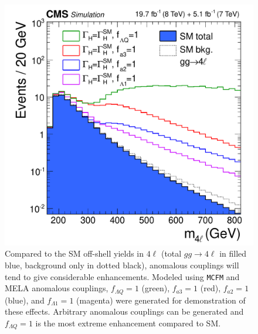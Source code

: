 \begin{figure}[htbp]
\begin{center}
\includegraphics[width=.7\linewidth]{HiggsProperties/figures/cCanvas_MCFMBSM_GenLevel_new.pdf}
\caption[Simulated Off-shell Enhancements in the $4\ell$ Channel from Anomalous $HVV$ Couplings]{Compared to the SM off-shell yields in $4\ell$ (total $gg\rightarrow 4\ell$ in filled blue, background only in dotted black), anomalous couplings will tend to give considerable enhancements. Modeled using {\tt MCFM} and MELA anomalous couplings, $f_{\Lambda Q}=1$ (green), $f_{a3}=1$ (red), $f_{a2}=1$ (blue), and $f_{\Lambda 1}=1$ (magenta) were generated for demonstration of these effects. Arbitrary anomalous couplings can be generated and $f_{\Lambda Q}=1$ is the most extreme enhancement compared to SM.}
\label{fig:MCFMOffShellBSM}
\end{center}
\end{figure}

